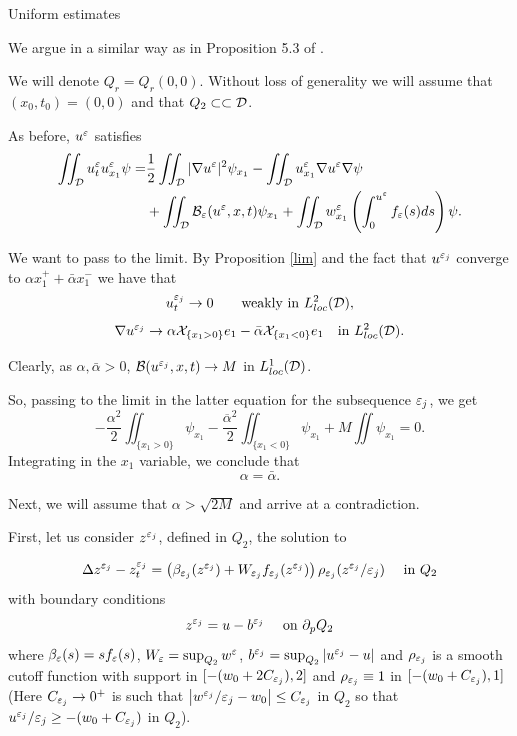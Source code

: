 \begin{section}{Uniform estimates}
\begin{pf}
We argue in a similar way as in Proposition 5.3 of \cite{CLW1}.

We will denote $Q_r = Q_r(0,0)$. Without loss of generality we will assume 
that $(x_0,t_0)=(0,0)$ and that $Q_2\subset\subset \cal D$.

As before, $u^{\varepsilon}$ satisfies 
\begin{align*}
\iint_{\cal D} u^{\varepsilon}_t u^{\varepsilon}_{x_1}\psi =&
\frac12\iint_{\cal D}|\nabla u^{\varepsilon}|^2 \psi_{x_1} - 
\iint_{\cal D} u^{\varepsilon}_{x_1}\nabla u^{\varepsilon}\nabla\psi\\
& + \iint_{\cal D}{{\cal B}}_{\varepsilon}(u^{\varepsilon},x,t)\psi_{x_1} + 
\iint_{\cal D}w^{\varepsilon}_{x_1}\left(\int_0^{u^{\varepsilon}} f_{\varepsilon}(s) ds\right)\psi.
\end{align*}

We want to pass to the limit. By Proposition \ref{lim} and the fact that 
$u^{\varepsilon_j}$ converge to $\alpha x_1^+ + \bar{\alpha} x_1^-$ we have 
that
$$u^{\varepsilon_j}_t\to 0  \qquad \mbox{weakly in } L^2_{loc}(\cal D),$$
$$\nabla u^{\varepsilon_j}\to \alpha {\cal X}_{\{x_1>0\}}e_1 - 
\bar{\alpha} {\cal X}_{\{x_1<0\}} e_1
\quad \mbox{in } L^2_{loc}(\cal D).$$

Clearly, as $\alpha,\bar{\alpha}>0$, ${\cal B}(u^{\varepsilon_j},x,t)\to M$ in 
$L^1_{loc}(\cal D)$.

So, passing to the limit in the latter equation for the subsequence $\varepsilon_j$, 
we get 
$$ - \frac{\alpha^2}{2}\iint_{\{x_1>0\}}\psi_{x_1} - 
\frac{\overline{\alpha}^2}{2}\iint_{\{x_1<0\}}\psi_{x_1}+
M\iint \psi_{x_1} = 0.$$
Integrating in the $x_1$ variable, we conclude that 
$$\alpha = \bar{\alpha}.$$

Next, we will assume that $\alpha>\sqrt{2M}$ and arrive at a contradiction.

First, let us consider  $z^{\varepsilon_j}$, defined in 
$Q_2$, the solution to 

\begin{equation}
\label{eqz}
\Delta z^{\varepsilon_j} - z^{\varepsilon_j}_t = \left(\beta_{\varepsilon_j}(z^{\varepsilon_j}) +
W_{\varepsilon_j} f_{\varepsilon_j}(z^{\varepsilon_j})\right)\rho_{\varepsilon_j}(z^{\varepsilon_j}/{\varepsilon_j})\quad\mbox{ in }
Q_2
\end{equation}
with  boundary conditions
$$
z^{\varepsilon_j} = u - b^{\varepsilon_j} \quad\mbox{ on } \partial_p Q_2
$$
where $\beta_{\varepsilon}(s) = sf_{\varepsilon}(s)$, $W_{\varepsilon} = \sup_{Q_2} w^{\varepsilon}$, 
$b^{\varepsilon_j} = \sup_{Q_2}|u^{\varepsilon_j} - u|$ and $\rho_{\varepsilon_j}$ is a smooth cutoff 
function with support in $[-(w_0+2C_{\varepsilon_j}),2]$ and $\rho_{\varepsilon_j}\equiv1$ in 
$[-(w_0+C_{\varepsilon_j}),1]$ (Here $C_{{\varepsilon_j}}\to0^+$ is such that $\big|w^{\varepsilon_j}/{\varepsilon_j}
-w_0\big|\le C_{{\varepsilon_j}}$ in $Q_2$
so that $u^{\varepsilon_j}/{\varepsilon_j}\ge-(w_0+C_{{\varepsilon_j}})$ in $Q_2$).



\end{pf}
\end{section}
